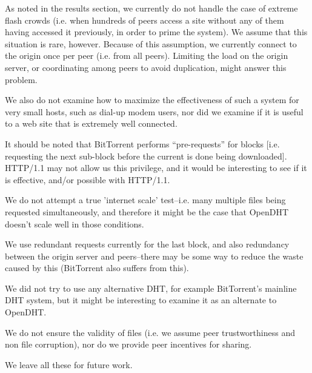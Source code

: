 As noted in the results section, we currently do not handle the case of extreme flash crowds (i.e. when hundreds of peers access a site without any of them having accessed it previously, in order to prime the system).  We assume that this situation is rare, however.  Because of this assumption, we currently connect to the origin once per peer (i.e. from all peers). Limiting the load on the origin server, or coordinating among peers to avoid duplication, might answer this problem.

We also do not examine how to maximize the effectiveness of such a system for very small hosts, such as dial-up modem users, nor did we examine if it is useful to a web site that is extremely well connected.

It should be noted that BitTorrent performs ``pre-requests'' for blocks [i.e. requesting the next sub-block before the current is done being downloaded].   HTTP/1.1 may not allow us this privilege, and it would be interesting to see if it is effective, and/or possible with HTTP/1.1.

We do not attempt a true 'internet scale' test--i.e. many multiple files being requested simultaneously, and therefore it might be the case that OpenDHT doesn't scale well in those conditions.

We use redundant requests currently for the last block, and also redundancy between the origin server and peers--there may be some way to reduce the waste caused by this (BitTorrent also suffers from this).

We did not try to use any alternative DHT, for example BitTorrent's mainline DHT system, but it might be interesting to examine it as an alternate to OpenDHT.

We do not ensure the validity of files (i.e. we assume peer trustworthiness and non file corruption), nor do we provide peer incentives for sharing.

We leave all these for future work.
